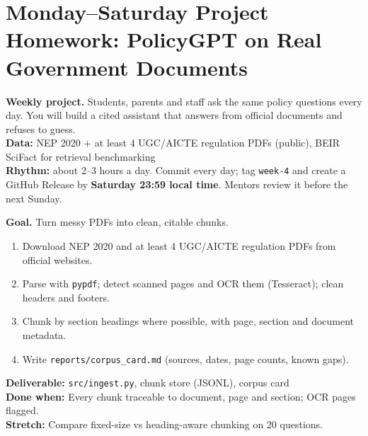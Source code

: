 \clearpage
\section*{Monday--Saturday Project Homework: PolicyGPT on Real Government Documents}
\begin{tcolorbox}[enhanced,colback=navy,colframe=gold,boxrule=0.8pt,arc=3pt,coltext=white,left=8pt,right=8pt,top=6pt,bottom=6pt]
{\color{gold}\bfseries Weekly project.} Students, parents and staff ask the same policy questions every day. You will build a cited assistant that answers from official documents and refuses to guess.\\[3pt]
{\color{gold}\bfseries Data:} NEP 2020 + at least 4 UGC/AICTE regulation PDFs (public), BEIR SciFact for retrieval benchmarking\\[3pt]
{\color{gold}\bfseries Rhythm:} about 2--3 hours a day. Commit every day; tag \texttt{week-4} and create a GitHub Release by \textbf{Saturday 23:59 local time}. Mentors review it before the next Sunday.
\end{tcolorbox}

\begin{tcolorbox}[enhanced,breakable,colback=white,colframe=sun,boxrule=0.8pt,arc=2pt,left=7pt,right=7pt,top=4pt,bottom=4pt,
  title={\bfseries Monday --- Ingestion at real scale\hfill\normalfont\small 3 h},coltitle=white,colbacktitle=sun,fonttitle=\small]
\textbf{Goal.} Turn messy PDFs into clean, citable chunks.
\begin{enumerate}[itemsep=1pt,topsep=2pt]
  \item Download NEP 2020 and at least 4 UGC/AICTE regulation PDFs from official websites.
  \item Parse with \texttt{pypdf}; detect scanned pages and OCR them (Tesseract); clean headers and footers.
  \item Chunk by section headings where possible, with page, section and document metadata.
  \item Write \texttt{reports/corpus\_card.md} (sources, dates, page counts, known gaps).
\end{enumerate}
\textbf{\color{dataC}Deliverable:} \texttt{src/ingest.py}, chunk store (JSONL), corpus card\\
\textbf{\color{navy}Done when:} Every chunk traceable to document, page and section; OCR pages flagged.\\
\textbf{\color{skillC}Stretch:} Compare fixed-size vs heading-aware chunking on 20 questions.
\end{tcolorbox}

